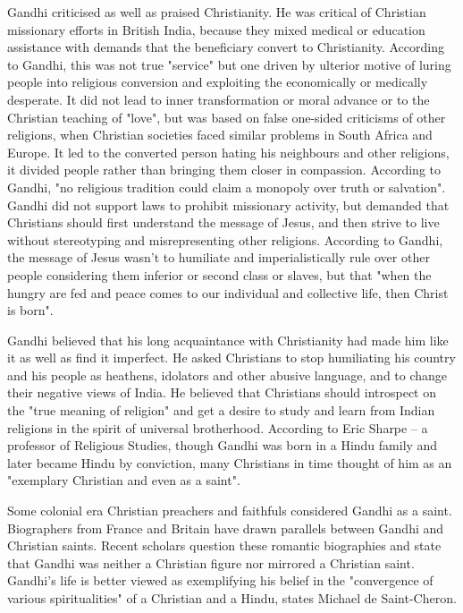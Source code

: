 Gandhi criticised as well as praised Christianity. He was critical of
Christian missionary efforts in British India, because they mixed
medical or education assistance with demands that the beneficiary
convert to Christianity. According to Gandhi, this was not true
"service" but one driven by ulterior motive of luring people into
religious conversion and exploiting the economically or medically
desperate. It did not lead to inner transformation or moral advance or
to the Christian teaching of "love", but was based on false one-sided
criticisms of other religions, when Christian societies faced similar
problems in South Africa and Europe. It led to the converted person
hating his neighbours and other religions, it divided people rather than
bringing them closer in compassion. According to Gandhi, "no religious
tradition could claim a monopoly over truth or salvation". Gandhi did
not support laws to prohibit missionary activity, but demanded that
Christians should first understand the message of Jesus, and then strive
to live without stereotyping and misrepresenting other religions.
According to Gandhi, the message of Jesus wasn't to humiliate and
imperialistically rule over other people considering them inferior or
second class or slaves, but that "when the hungry are fed and peace
comes to our individual and collective life, then Christ is born".

Gandhi believed that his long acquaintance with Christianity had made
him like it as well as find it imperfect. He asked Christians to stop
humiliating his country and his people as heathens, idolators and other
abusive language, and to change their negative views of India. He
believed that Christians should introspect on the "true meaning of
religion" and get a desire to study and learn from Indian religions in
the spirit of universal brotherhood. According to Eric Sharpe -- a
professor of Religious Studies, though Gandhi was born in a Hindu family
and later became Hindu by conviction, many Christians in time thought of
him as an "exemplary Christian and even as a saint".

Some colonial era Christian preachers and faithfuls considered Gandhi as
a saint. Biographers from France and Britain have drawn parallels
between Gandhi and Christian saints. Recent scholars question these
romantic biographies and state that Gandhi was neither a Christian
figure nor mirrored a Christian saint. Gandhi's life is better viewed as
exemplifying his belief in the "convergence of various spiritualities"
of a Christian and a Hindu, states Michael de Saint-Cheron.


